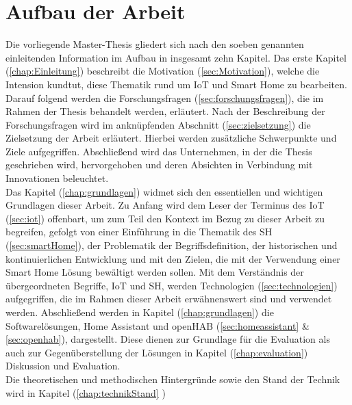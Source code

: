 \section{Aufbau der Arbeit}
\label{sec:aufbau}
    Die vorliegende Master-Thesis gliedert sich nach den soeben genannten einleitenden Information im Aufbau in insgesamt 
    zehn Kapitel. Das erste Kapitel (\ref{chap:Einleitung}) beschreibt die Motivation (\ref{sec:Motivation}), welche die 
    Intension kundtut, diese Thematik rund um \acs{IoT} und Smart Home zu bearbeiten. Darauf folgend werden die 
    Forschungsfragen (\ref{sec:forschungsfragen}), die im Rahmen der Thesis behandelt werden, erläutert. Nach der 
    Beschreibung der Forschungsfragen wird im anknüpfenden Abschnitt (\ref{sec:zielsetzung}) die Zielsetzung der 
    Arbeit erläutert. Hierbei werden zusätzliche Schwerpunkte und Ziele aufgegriffen. Abschließend wird das Unternehmen, in der 
    die Thesis geschrieben wird, hervorgehoben und deren Absichten in Verbindung mit Innovationen beleuchtet. 
    \\
    \linebreak
    Das Kapitel (\ref{chap:grundlagen}) widmet sich den essentiellen und wichtigen Grundlagen dieser Arbeit. Zu Anfang wird dem 
    Leser der Terminus des \acl{IoT} (\ref{sec:iot}) offenbart, um zum Teil den Kontext im Bezug zu dieser Arbeit zu begreifen, 
    gefolgt von einer Einführung in die Thematik des \acl{SH} (\ref{sec:smartHome}), der Problematik der Begriffsdefinition, der 
    historischen und kontinuierlichen Entwicklung und mit den Zielen, die mit der Verwendung einer Smart Home Lösung bewältigt 
    werden sollen. Mit dem Verständnis der übergeordneten Begriffe, \acs{IoT} und \acl{SH}, werden Technologien 
    (\ref{sec:technologien}) aufgegriffen, die im Rahmen dieser Arbeit erwähnenswert sind und verwendet werden. %
    Abschließend werden in Kapitel (\ref{chap:grundlagen}) die Softwarelösungen, Home Assistant 
    und openHAB (\ref{sec:homeassistant} \& \ref{sec:openhab}), dargestellt. Diese dienen zur Grundlage für die Evaluation als 
    auch zur Gegenüberstellung der Lösungen in Kapitel (\ref{chap:evaluation}) Diskussion und Evaluation. 
    \\
    \linebreak
    Die theoretischen und methodischen Hintergründe sowie den Stand der Technik wird in Kapitel (\ref{chap:technikStand} )
